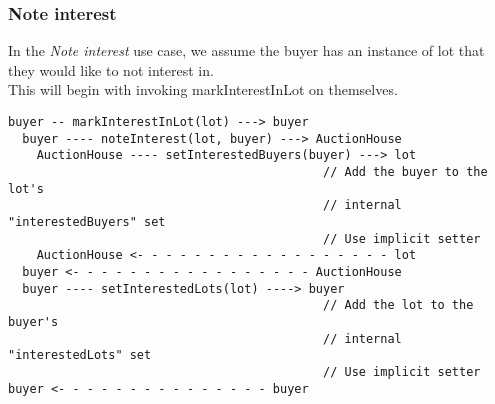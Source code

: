 \documentclass[titlepage, 12pt]{extarticle}
\begin{document}
\subsubsection{Note interest}
In the {\it Note interest} use case, we assume the buyer has an instance of lot that they would like to not interest in.\\
This will begin with invoking markInterestInLot on themselves.
\begin{verbatim}
buyer -- markInterestInLot(lot) ---> buyer
  buyer ---- noteInterest(lot, buyer) ---> AuctionHouse
    AuctionHouse ---- setInterestedBuyers(buyer) ---> lot
                                            // Add the buyer to the lot's
                                            // internal "interestedBuyers" set
                                            // Use implicit setter
    AuctionHouse <- - - - - - - - - - - - - - - - - - lot
  buyer <- - - - - - - - - - - - - - - - - AuctionHouse
  buyer ---- setInterestedLots(lot) ----> buyer 
                                            // Add the lot to the buyer's
                                            // internal "interestedLots" set
                                            // Use implicit setter
buyer <- - - - - - - - - - - - - - - buyer
\end{verbatim}
\end{document}
